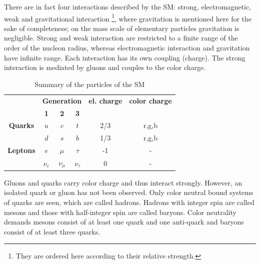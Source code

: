 There are in fact four interactions described by the SM: strong, electromagnetic, weak and gravitational interaction \footnote{They are ordered here according to their relative strength.}, where gravitation is mentioned here for the sake of completeness; on the mass scale of elementary particles gravitation is negligible. Strong and weak interaction are restricted to a finite range of the order of the nucleon radius, whereas electromagnetic interaction and gravitation have infinite range. Each interaction has its own coupling (charge). The strong interaction is mediated by gluons and couples to the color charge.%
\begin{table}[htbp]
	\centering
	\begin{tabular}{cccccc}
		\toprule
		&\multicolumn{3}{c}{\textbf{Generation}}&\textbf{el. charge}&\textbf{color charge}\\
		&\textbf{1} & \textbf{2} & \textbf{3} & & \\
		\hline
		\textbf{Quarks} & $u$&$c$&$t$& 2/3 & r,g,b\\
		&$d$&$s$&$b$& 1/3 & r,g,b\\
		\textbf{Leptons}& $e$&$\mu$&$\tau$&-1& -\\
		& $\nu_e$&$\nu_\mu$&$\nu_\tau$&0&-\\
		\bottomrule

	\end{tabular}
\caption{Summary of the particles of the SM}
\label{tab:sm0}
\end{table}
%



Gluons and quarks carry color charge and thus interact strongly. However, an isolated quark or gluon has not been observed. Only color neutral bound systems of quarks are seen, which are called hadrons. Hadrons with integer spin are called mesons and those with half-integer spin are called baryons. Color neutrality demands mesons consist of at least one quark and one anti-quark and baryons consist of at least three quarks.


